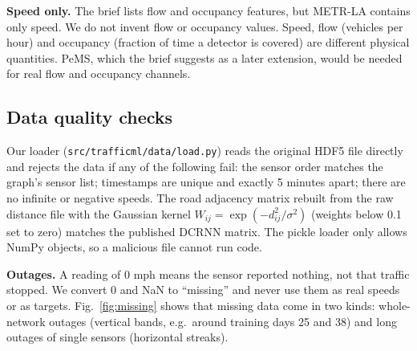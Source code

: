 \documentclass[conference]{IEEEtran}
\begin{document}
\begin{table}[t]
\centering
\caption{METR-LA dataset summary (verified by our loader)}
\label{tab:data}
\end{table}

\textbf{Speed only.} The brief lists flow and occupancy features, but METR-LA contains only speed. We do not invent flow or occupancy values. Speed, flow (vehicles per hour) and occupancy (fraction of time a detector is covered) are different physical quantities. PeMS, which the brief suggests as a later extension, would be needed for real flow and occupancy channels.

\subsection{Data quality checks}
Our loader (\texttt{src/trafficml/data/load.py}) reads the original HDF5 file directly and rejects the data if any of the following fail: the sensor order matches the graph's sensor list; timestamps are unique and exactly 5 minutes apart; there are no infinite or negative speeds. The road adjacency matrix rebuilt from the raw distance file with the Gaussian kernel $W_{ij}=\exp(-d_{ij}^2/\sigma^2)$ (weights below 0.1 set to zero) matches the published DCRNN matrix. The pickle loader only allows NumPy objects, so a malicious file cannot run code.

\textbf{Outages.} A reading of 0 mph means the sensor reported nothing, not that traffic stopped. We convert 0 and NaN to ``missing'' and never use them as real speeds or as targets. Fig.~\ref{fig:missing} shows that missing data come in two kinds: whole-network outages (vertical bands, e.g.\ around training days 25 and 38) and long outages of single sensors (horizontal streaks).
\end{document}
